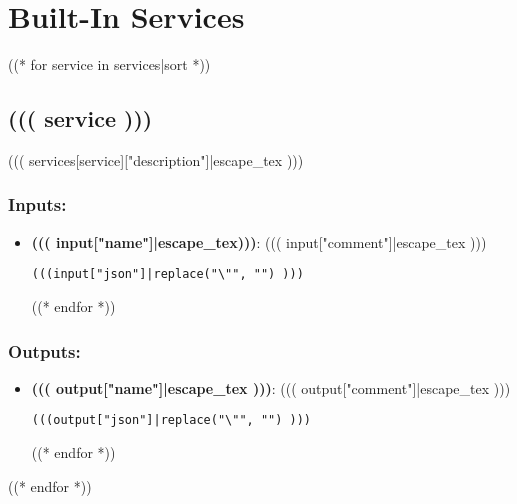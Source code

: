 \section{Built-In Services}
\label{ch:builtinservices}

((* for service in services|sort *))
\subsection{((( service )))}
\label{ch:builtinservices:((( service )))}
((( services[service]["description"]|escape_tex )))
\subsubsection*{Inputs:}
\begin{itemize}
  \small
  ((* for input in services[service]["inputs"] *))
  \item \textbf{((( input["name"]|escape_tex)))}: ((( input["comment"]|escape_tex )))
\begin{lstlisting}
(((input["json"]|replace("\"", "") )))
\end{lstlisting}
  ((* endfor *))
\end{itemize}
\subsubsection*{Outputs:}
\begin{itemize}
  \small
  ((* for output in services[service]["outputs"] *))
  \item \textbf{((( output["name"]|escape_tex )))}: ((( output["comment"]|escape_tex )))
\begin{lstlisting}
(((output["json"]|replace("\"", "") )))
\end{lstlisting}
  ((* endfor *))
\end{itemize}

((* endfor *))
